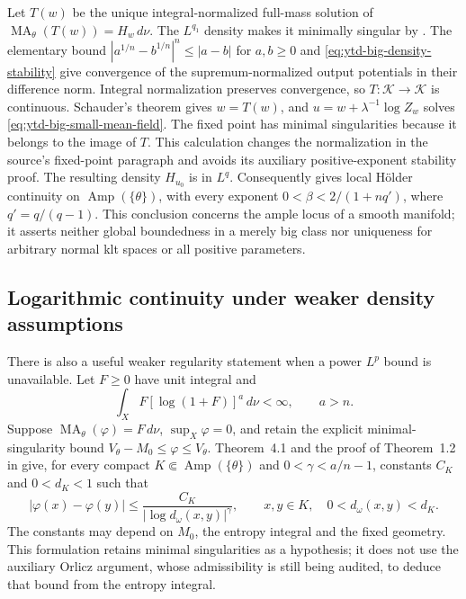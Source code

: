 Let $T(w)$ be the unique integral-normalized full-mass solution
of $\operatorname{MA}_\theta(T(w))=H_w\,d\nu$.
The $L^{q_1}$ density makes it minimally singular by
\cite[Theorem~B]{BEGZ10BigV2}. The elementary bound
$|a^{1/n}-b^{1/n}|^n\leq|a-b|$ for $a,b\geq0$ and
\eqref{eq:ytd-big-density-stability} give convergence of the
supremum-normalized output potentials in their difference norm.
Integral normalization preserves convergence, so
$T:\mathcal K\to\mathcal K$ is continuous. Schauder's theorem
gives $w=T(w)$, and $u=w+\lambda^{-1}\log Z_w$ solves
\eqref{eq:ytd-big-small-mean-field}. The fixed point has minimal
singularities because it belongs to the image of $T$.
This calculation changes the normalization in the source's
fixed-point paragraph and avoids its auxiliary positive-exponent
stability proof. The resulting density $H_{u_0}$
is in $L^q$. Consequently
\cite[Theorem~D]{DDGHKZ14HolderPublished} gives local H\"older
continuity on $\operatorname{Amp}(\{\theta\})$, with every
exponent $0<\beta<2/(1+nq')$, where $q'=q/(q-1)$.
This conclusion concerns the ample locus of a smooth manifold;
it asserts neither global boundedness in a merely big class nor
uniqueness for arbitrary normal klt spaces or all positive parameters.

\subsection{Logarithmic continuity under weaker density assumptions}
\label{sec:ytd-big-log-modulus}

There is also a useful weaker regularity statement when a power
$L^p$ bound is unavailable. Let $F\geq0$ have unit integral and
\[
\tag{68.23q}\label{eq:ytd-big-log-density}
 \int_X F[\log(1+F)]^a\,d\nu<\infty,
 \qquad a>n.
\]
Suppose $\operatorname{MA}_\theta(\varphi)=F\,d\nu$,
$\sup_X\varphi=0$, and retain the explicit minimal-singularity
bound $V_\theta-M_0\leq\varphi\leq V_\theta$.
Theorem~4.1 and the proof of Theorem~1.2 in
\cite{DangZhangZhou26UniquenessV1} give, for every compact
$K\Subset\operatorname{Amp}(\{\theta\})$ and
$0<\gamma<a/n-1$, constants $C_K$ and $0<d_K<1$ such that
\[
\tag{68.23r}\label{eq:ytd-big-log-modulus}
 |\varphi(x)-\varphi(y)|
 \leq\frac{C_K}{|\log d_\omega(x,y)|^\gamma},
 \qquad x,y\in K,\quad0<d_\omega(x,y)<d_K.
\]
The constants may depend on $M_0$, the entropy integral and the
fixed geometry. This formulation retains minimal singularities
as a hypothesis; it does not use the auxiliary Orlicz argument,
whose admissibility is still being audited, to deduce that bound
from the entropy integral.

